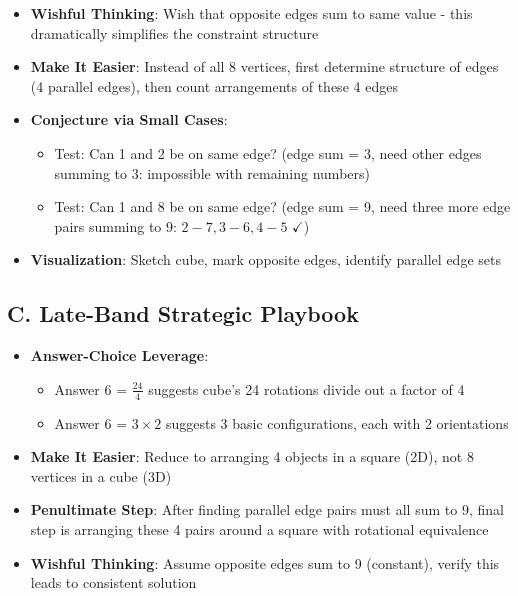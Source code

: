 \documentclass[]{article}
\begin{document}
\begin{strategicbox}
\begin{itemize}[leftmargin=*]
    \item \textbf{Wishful Thinking}: Wish that opposite edges sum to same value - this dramatically simplifies the constraint structure
    
    \item \textbf{Make It Easier}: Instead of all 8 vertices, first determine structure of edges (4 parallel edges), then count arrangements of these 4 edges
    
    \item \textbf{Conjecture via Small Cases}:
    \begin{itemize}
        \item Test: Can 1 and 2 be on same edge? (edge sum = 3, need other edges summing to 3: impossible with remaining numbers)
        \item Test: Can 1 and 8 be on same edge? (edge sum = 9, need three more edge pairs summing to 9: $2-7, 3-6, 4-5$ $\checkmark$)
    \end{itemize}
    
    \item \textbf{Visualization}: Sketch cube, mark opposite edges, identify parallel edge sets
\end{itemize}

\subsection*{C. Late-Band Strategic Playbook}
\begin{itemize}[leftmargin=*]
    \item \textbf{Answer-Choice Leverage}: 
    \begin{itemize}
        \item Answer 6 = $\frac{24}{4}$ suggests cube's 24 rotations divide out a factor of 4
        \item Answer 6 = $3 \times 2$ suggests 3 basic configurations, each with 2 orientations
    \end{itemize}
    
    \item \textbf{Make It Easier}: Reduce to arranging 4 objects in a square (2D), not 8 vertices in a cube (3D)
    
    \item \textbf{Penultimate Step}: After finding parallel edge pairs must all sum to 9, final step is arranging these 4 pairs around a square with rotational equivalence
    
    \item \textbf{Wishful Thinking}: Assume opposite edges sum to 9 (constant), verify this leads to consistent solution
    

\end{itemize}
\end{strategicbox}
\end{document}
